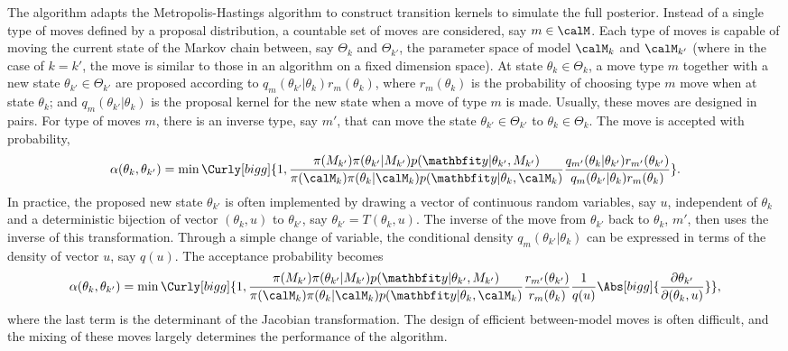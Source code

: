 The \rjmcmc algorithm adapts the Metropolis-Hastings algorithm to construct transition kernels to simulate the full posterior. Instead of a single type of moves defined by a proposal distribution, a countable set of moves are considered, say $m\in\calM$. Each type of moves is capable of moving the current state of the Markov chain between, say $\Theta_k$ and $\Theta_{k'}$, the parameter space of model $\calM_k$ and $\calM_{k'}$ (where in the case of $k = k'$, the move is similar to those in an \mcmc algorithm on a fixed dimension space). At state $\theta_k\in\Theta_k$, a move type $m$ together with a new state $\theta_{k'}\in\Theta_{k'}$ are proposed according to $q_m(\theta_{k'}|\theta_k)r_m(\theta_k)$, where $r_m(\theta_k)$ is the probability of choosing type $m$ move when at state $\theta_k$; and $q_m(\theta_{k'}|\theta_k)$ is the proposal kernel for the new state when a move of type $m$ is made. Usually, these moves are designed in pairs. For type of moves $m$, there is an inverse type, say $m'$, that can move the state $\theta_{k'}\in\Theta_{k'}$ to $\theta_k\in\Theta_k$. The move is accepted with probability,
\begin{equation}
  \alpha(\theta_k,\theta_{k'}) =
  \min\Curly[bigg]{1,
    \frac{\pi(M_{k'})\pi(\theta_{k'}|M_{k'})p(\data|\theta_{k'},M_{k'})}
    {\pi(\calM_k)\pi(\theta_k|\calM_k)p(\data|\theta_k,\calM_k)}
    \frac{q_{m'}(\theta_k|\theta_{k'})r_{m'}(\theta_{k'})}
    {q_m(\theta_{k'}|\theta_k)r_m(\theta_k)}
  }.
\end{equation}
In practice, the proposed new state $\theta_{k'}$ is often implemented by drawing a vector of continuous random variables, say $u$, independent of $\theta_k$ and a deterministic bijection of vector $(\theta_k,u)$ to $\theta_{k'}$, say $\theta_{k'} = T(\theta_k,u)$. The inverse of the move from $\theta_{k'}$ back to $\theta_k$, $m'$, then uses the inverse of this transformation. Through a simple change of variable, the conditional density $q_m(\theta_{k'}|\theta_k)$ can be expressed in terms of the density of vector $u$, say $q(u)$. The acceptance probability becomes
\begin{equation}
  \alpha(\theta_k,\theta_{k'}) =
  \min\Curly[bigg]{1,
    \frac{\pi(M_{k'})\pi(\theta_{k'}|M_{k'})p(\data|\theta_{k'},M_{k'})}
    {\pi(\calM_k)\pi(\theta_k|\calM_k)p(\data|\theta_k,\calM_k)}
    \frac{r_{m'}(\theta_{k'})}{r_m(\theta_k)}
    \frac{1}{q(u)}\Abs[bigg]{\frac{\partial\theta_{k'}}{\partial(\theta_k,u)}}
  },
\end{equation}
where the last term is the determinant of the Jacobian transformation. The design of efficient between-model moves is often difficult, and the mixing of these moves largely determines the performance of the algorithm.

